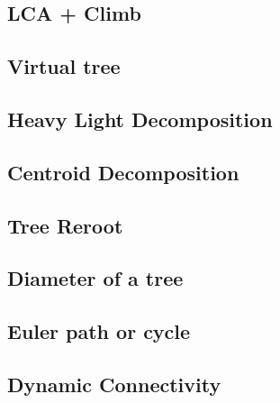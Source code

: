 \subsection{LCA + Climb}

\newpage
\subsection{Virtual tree}


\subsection{Heavy Light Decomposition}

\newpage
\subsection{Centroid Decomposition}


\subsection{Tree Reroot}


\newpage
\subsection{Diameter of a tree}


\subsection{Euler path or cycle}


\subsection{Dynamic Connectivity}

